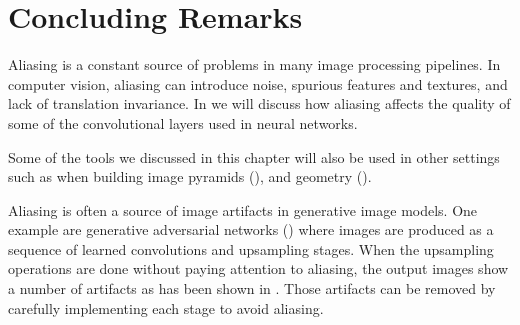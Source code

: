 

\section{Concluding Remarks}

Aliasing is a constant source of problems in many image processing pipelines. In computer vision, aliasing can introduce noise, spurious features and textures, and lack of translation invariance. In \chap{\ref{chapter:convolutional_neural_nets}} we will discuss how aliasing affects the quality of some of the convolutional layers used in neural networks. 

Some of the tools we discussed in this chapter will also be used in other settings such as when building image pyramids (\chap{\ref{chapter:image_pyramids}}), and geometry (\chap{\ref{chapter:geometry_homogeneous}}).

Aliasing is often a source of image artifacts in generative image models. One example are generative adversarial networks (\chap{\ref{chapter:generative_models}}) where images are produced as a sequence of learned convolutions and upsampling stages. When the upsampling operations are done without paying attention to aliasing, the output images show a number of artifacts as has been shown in \cite{Karras2021}. Those artifacts can be removed by carefully implementing each stage to avoid aliasing. 

